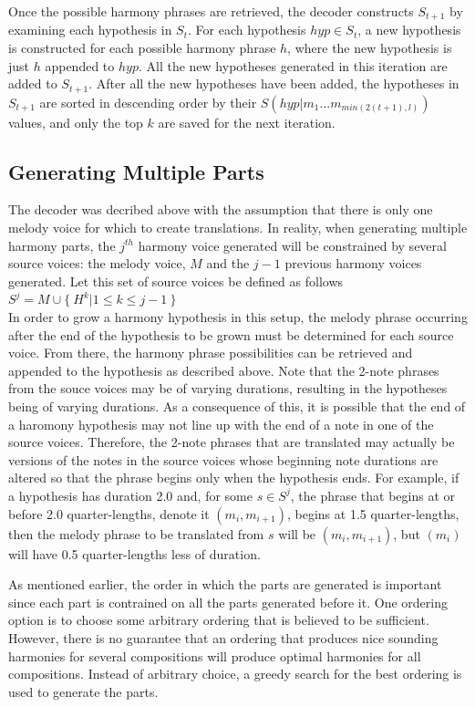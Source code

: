 \documentclass{sig-alternate}
\begin{document}
Once the possible harmony phrases are retrieved, the decoder constructs $S_{t + 1}$ by examining each hypothesis in $S_{t}$. For each hypothesis $hyp \in S_{t}$, a new hypothesis is constructed for each possible harmony phrase $h$, where the new hypothesis is just $h$ appended to $hyp$. All the new hypotheses generated in this iteration are added to $S_{t + 1}$. After all the new hypotheses have been added, the hypotheses in $S_{t + 1}$ are sorted in descending order by their $S(hyp | m_{1} ... m_{min(2(t +1), l)})$ values, and only the top $k$ are saved for the next iteration.

\subsection {Generating Multiple Parts}
The decoder was decribed above with the assumption that there is only one melody voice for  which to create translations. In reality, when generating multiple harmony parts, the $j^{th}$ harmony voice generated will be constrained by several source voices: the melody voice, $M$ and the $j-1$ previous harmony voices generated. Let this set of source voices be defined as follows\\

$S^{j} = {M} \cup \{\ H^k | 1 \leq k \leq j- 1\ \} $\\

In order to grow a harmony hypothesis in this setup, the melody phrase occurring after the end of the hypothesis to be grown must be determined for each source voice. From there, the harmony phrase possibilities can be retrieved and appended to the hypothesis as described above. Note that the 2-note phrases from the souce voices may be of varying durations, resulting in the hypotheses being of varying durations. As a consequence of this, it is possible that the end of a haromony hypothesis may not line up with the end of a note in one of the source voices. Therefore, the 2-note phrases that are translated may actually be versions of the notes in the source voices whose beginning note durations are altered so that the phrase begins only when the hypothesis ends. For example, if a hypothesis has duration 2.0 and, for some $s \in S^{j}$, the phrase that begins at or before 2.0 quarter-lengths, denote it $(m_{i}, m_{i + 1})$, begins at 1.5 quarter-lengths, then the melody phrase to be translated from $s$ will be $(m_{i}, m_{i + 1})$, but $(m_{i})$ will have 0.5 quarter-lengths less of duration. 

As mentioned earlier, the order in which the parts are generated is important since each part is contrained on all the parts generated before it. One ordering option is to choose some arbitrary ordering that is believed to be sufficient. However, there is no guarantee that an ordering that produces nice sounding harmonies for several compositions will produce optimal harmonies for all compositions. Instead of arbitrary choice, a greedy search for the best ordering is used to generate the parts.
\end{document}
